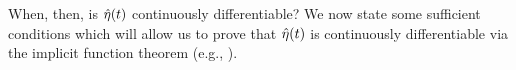 When, then, is $\hat\eta(t)$ continuously differentiable?  We now state some
sufficient conditions which will allow us to prove that $\hat\eta(t)$ is
continuously differentiable via the implicit function theorem
(e.g., \citet{krantz:2012:implicit}).
%
%




